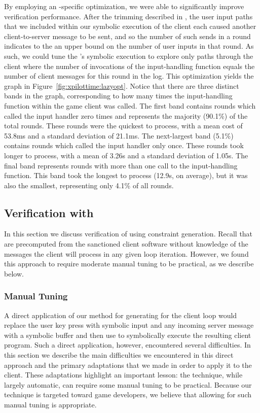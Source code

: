 By employing an \xpilot-specific optimization, we were able
to significantly improve verification performance.  After the trimming
described in , the user input paths that we
included within our symbolic execution of the client each caused
another client-to-server message to be sent, and so the number of such
sends in a round indicates to the \verifier an upper bound on the
number of user inputs in that round.  As such, we could tune the
\verifier's symbolic execution to explore only paths through the
client where the number of invocations of the input-handling function
equals the number of client messages for this round in the log.  This
optimization yields the graph in Figure~\ref{fig:xpilottime:lazyopt}.
Notice that there are three distinct bands in the graph, corresponding
to how many times the input-handling function within the game client
was called.  The first band contains rounds which called the input
handler zero times and represents the majority (90.1\%) of the total
rounds.  These rounds were the quickest to process, with a mean cost
of 53.8ms and a standard deviation of 21.1ms.  The next-largest band
(5.1\%) contains rounds which called the input handler only once.
These rounds took longer to process, with a mean of 3.26s and a
standard deviation of 1.05s.  The final band represents rounds with
more than one call to the input-handling function.  This band took the
longest to process (12.9s, on average), but it was also the smallest, 
representing only 4.1\% of all rounds.

\subsection{Verification with \Eager \PathsegCons}
\label{ssec:scv:xpilot:eager}

In this section we discuss verification of \xpilot using \eager
constraint generation.  Recall that \eager \pathsegcons are
precomputed from the sanctioned client software without knowledge of
the messages the client will process in any given loop iteration.
However, we found this approach to require moderate manual tuning
to be practical, as we describe below.

\subsubsection{Manual Tuning}
\label{sssec:xpilot:eager:tuning}

A direct application of our method for generating \eager
\pathsegcons for the \xpilot client loop would replace the user key
press with symbolic input and any incoming server message with a
symbolic buffer and then use \klee to symbolically execute the
resulting client program.  Such a direct application, however,
encountered several difficulties.  In this section we describe the
main difficulties we encountered in this direct approach and the
primary adaptations that we made in order to apply it to the \xpilot
client.  These adaptations highlight an important lesson: the \eager
technique, while largely automatic, can require some manual tuning to
be practical.  Because our technique is targeted toward game
developers, we believe that allowing for such manual tuning is
appropriate.

